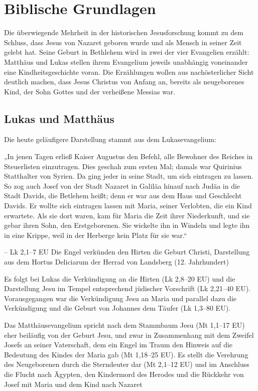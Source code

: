 
\chapter{Biblische Grundlagen}
\label{chapter-basics}

Die überwiegende Mehrheit in der historischen Jesusforschung kommt zu dem Schluss, dass Jesus von Nazaret geboren wurde und als Mensch in seiner Zeit gelebt hat. Seine Geburt in Bethlehem wird in zwei der vier Evangelien erzählt: Matthäus und Lukas stellen ihrem Evangelium jeweils unabhängig voneinander eine Kindheitsgeschichte voran. Die Erzählungen wollen aus nachösterlicher Sicht deutlich machen, dass Jesus Christus von Anfang an, bereits als neugeborenes Kind, der Sohn Gottes und der verheißene Messias war.

\section{Lukas und Matthäus}

Die heute geläufigere Darstellung stammt aus dem Lukasevangelium:

    „In jenen Tagen erließ Kaiser Augustus den Befehl, alle Bewohner des Reiches in Steuerlisten einzutragen. Dies geschah zum ersten Mal; damals war Quirinius Statthalter von Syrien. Da ging jeder in seine Stadt, um sich eintragen zu lassen.
    So zog auch Josef von der Stadt Nazaret in Galiläa hinauf nach Judäa in die Stadt Davids, die Betlehem heißt; denn er war aus dem Haus und Geschlecht Davids. Er wollte sich eintragen lassen mit Maria, seiner Verlobten, die ein Kind erwartete. Als sie dort waren, kam für Maria die Zeit ihrer Niederkunft, und sie gebar ihren Sohn, den Erstgeborenen. Sie wickelte ihn in Windeln und legte ihn in eine Krippe, weil in der Herberge kein Platz für sie war.“

– Lk 2,1–7 EU
Die Engel verkünden den Hirten die Geburt Christi, Darstellung aus dem Hortus Deliciarum der Herrad von Landsberg (12. Jahrhundert)

Es folgt bei Lukas die Verkündigung an die Hirten (Lk 2,8–20 EU) und die Darstellung Jesu im Tempel entsprechend jüdischer Vorschrift (Lk 2,21–40 EU). Vorausgegangen war die Verkündigung Jesu an Maria und parallel dazu die Verkündigung und die Geburt von Johannes dem Täufer (Lk 1,3–80 EU).

Das Matthäusevangelium spricht nach dem Stammbaum Jesu (Mt 1,1–17 EU) eher beiläufig von der Geburt Jesu, und zwar in Zusammenhang mit dem Zweifel Josefs an seiner Vaterschaft, dem ein Engel im Traum den Hinweis auf die Bedeutung des Kindes der Maria gab (Mt 1,18–25 EU). Es stellt die Verehrung des Neugeborenen durch die Sterndeuter dar (Mt 2,1–12 EU) und im Anschluss die Flucht nach Ägypten, den Kindermord des Herodes und die Rückkehr von Josef mit Maria und dem Kind nach Nazaret 

